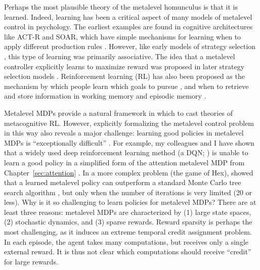 Perhaps the most plausible theory of the metalevel homunculus is that it is learned. Indeed, learning has been a critical aspect of many models of metalevel control in psychology. The earliest examples are found in cognitive architectures like ACT-R and SOAR, which have simple mechanisms for learning when to apply different production rules \citep{laird1986chunking}. However, like early models of strategy selection \citep{shrager1998scads}, this type of learning was primarily associative. The idea that a metalevel controller explicitly learns to maximize reward was proposed in later strategy selection models \citet{erev2005adaptation,rieskamp2006ssl,lieder2017strategy}. Reinforcement learning (RL) has also been proposed as the mechanism by which people learn which goals to pursue \citep{cushman2015habitual}, and when to retrieve and store information in working memory \citep{oreilly2006making,todd2008learning} and episodic memory \citep{lu2022neural}. 

Metalevel MDPs provide a natural framework in which to cast theories of metacognitive RL. However, explicitly formalizing the metalevel control problem in this way also reveals a major challenge: learning good policies in metalevel MDPs is ``exceptionally difficult'' \citep{hay2016principles}. For example, my colleagues and I have shown that a widely used deep reinforcement learning method (a DQN; \citealp{mnih2015humanlevel}) is unable to learn a good policy in a simplified form of the attention metalevel MDP from Chapter~\ref{sec:attention} \citep{callaway2018learning}. In a more complex problem (the game of Hex), \citet{hay2016principles} showed that a learned metalevel policy can outperform a standard Monte Carlo tree search algorithm \citep{kocsis2006bandit}, but only when the number of iterations is very limited (20 or less). Why is it so challenging to learn policies for metalevel MDPs? There are at least three reasons: metalevel MDPs are characterized by (1) large state spaces, (2) stochastic dynamics, and (3) sparse rewards. Reward sparsity is perhaps the most challenging, as it induces an extreme temporal credit assignment problem. In each episode, the agent takes many computations, but receives only a single external reward. It is thus not clear which computations should receive ``credit'' for large rewards. 

